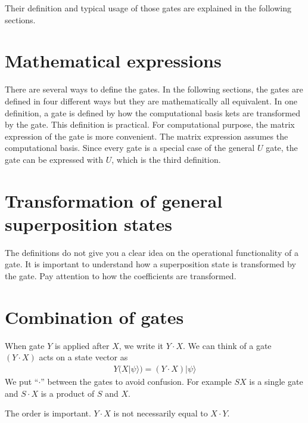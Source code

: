 \documentclass[letterpaper,10pt,english]{jupyterBook}
\begin{document}
\sphinxAtStartPar
Their definition and typical usage of those gates are explained in the following sections.


\section{Mathematical expressions}
\label{\detokenize{q1gates/intro:mathematical-expressions}}
\sphinxAtStartPar
There are several ways to define the gates. In the following sections, the gates are defined in four different ways but they  are mathematically all equivalent.  In one definition, a gate is defined by how the computational basis kets are transformed by the gate.  This definition is practical.  For computational purpose, the matrix expression of the gate is more convenient.  The matrix expression assumes the computational basis. Since every gate is a special case of the general \(U\) gate, the gate can be expressed with \(U\), which is the third definition.


\section{Transformation of general superposition states}
\label{\detokenize{q1gates/intro:transformation-of-general-superposition-states}}
\sphinxAtStartPar
The definitions do not give you a clear idea on the operational functionality of a gate.  It is important to understand how a superposition state is transformed by the gate. Pay attention to how the coefficients are transformed.


\section{Combination of gates}
\label{\detokenize{q1gates/intro:combination-of-gates}}
\sphinxAtStartPar
When gate \(Y\) is applied after \(X\), we write it \(Y \cdot X\). We can think of a gate \((Y \cdot X)\)  acts on a state vector as
\begin{equation*}
\begin{split}
Y (X |\psi\rangle) = (Y \cdot X) |\psi\rangle
\end{split}
\end{equation*}
\sphinxAtStartPar
We put “\(\cdot\)” between the gates to avoid confusion.  For example \(SX\) is a single gate and \(S \cdot X\) is a product of \(S\) and \(X\).

\sphinxAtStartPar
The order is important.  \(Y \cdot X\) is not necessarily equal to \(X \cdot Y\).
\end{document}
